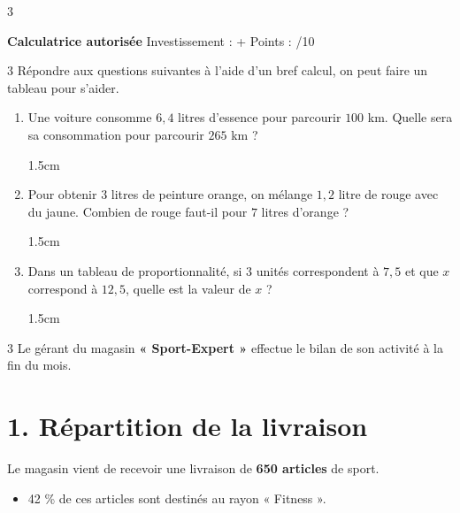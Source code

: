 \documentclass[a4paper]{book}
\begin{document}
{\begin{exerciceNote}{3}
\begin{minipage}{0.45\linewidth}
            \medskip 
            
            \dotfill
        \end{minipage}           
    \end{exerciceNote}


\newpage

\raggedright
\NomPrenom  \hfill \textbf{Calculatrice autorisée} \hfill  Investissement : + \quad \quad \quad Points : \quad \quad /10

    \begin{exerciceNote}{3}
        Répondre aux questions suivantes à l'aide d'un bref calcul, on peut faire un tableau pour s'aider.

        \begin{enumerate}[leftmargin=*]
            \item Une voiture consomme $6,4$ litres d'essence pour parcourir $100$ km. Quelle sera sa consommation pour parcourir $265$ km ?

            \begin{ZoneReponse}{1.5cm}                
            \end{ZoneReponse}

            \item Pour obtenir $3$ litres de peinture orange, on mélange $1,2$ litre de rouge avec du jaune. Combien de rouge faut-il pour $7$ litres d'orange ?

            \begin{ZoneReponse}{1.5cm}                
            \end{ZoneReponse}

            \item Dans un tableau de proportionnalité, si $3$ unités correspondent à $7,5$ et que $x$ correspond à $12,5$, quelle est la valeur de $x$ ?

            \begin{ZoneReponse}{1.5cm}                
            \end{ZoneReponse}
        \end{enumerate}
    \end{exerciceNote}


    \begin{exerciceNote}{3}
        \noindent Le gérant du magasin \textbf{« Sport-Expert »} effectue le bilan de son activité à la fin du mois.
    
        \section*{1. Répartition de la livraison}
        Le magasin vient de recevoir une livraison de \textbf{650 articles} de sport.
        \begin{itemize}[label=\textbullet]
            \item 42 \% de ces articles sont destinés au rayon « Fitness ».
        \end{itemize}
        

\end{exerciceNote}}
\end{document}
